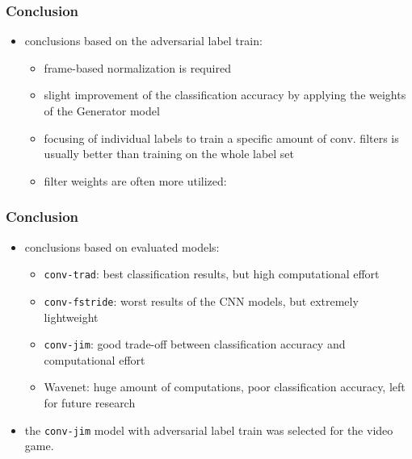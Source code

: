 \begin{frame}
  \frametitle{Conclusion}
  \begin{itemize}
  \item conclusions based on the adversarial label train:
    \begin{itemize}
      \item frame-based normalization is required
      \item slight improvement of the classification accuracy by applying the weights of the Generator model
      \item focusing of individual labels to train a specific amount of conv. filters is usually better than training on the whole label set
      \item filter weights are often more utilized:
    \end{itemize}
    \vspace{-0.25cm}
    \begin{figure}[!ht]
      \centering
    \end{figure}
  \end{itemize}
\end{frame}

\begin{frame}
  \frametitle{Conclusion}
  \begin{itemize}
  \item conclusions based on evaluated models:
    \begin{itemize}
      \item \texttt{conv-trad}: best classification results, but high computational effort
      \item \texttt{conv-fstride}: worst results of the CNN models, but extremely lightweight
      \item \texttt{conv-jim}: good trade-off between classification accuracy and computational effort
      \item Wavenet: huge amount of computations, poor classification accuracy, left for future research
    \end{itemize}
  \item the \texttt{conv-jim} model with adversarial label train was selected for the video game.
  \end{itemize}
\end{frame}